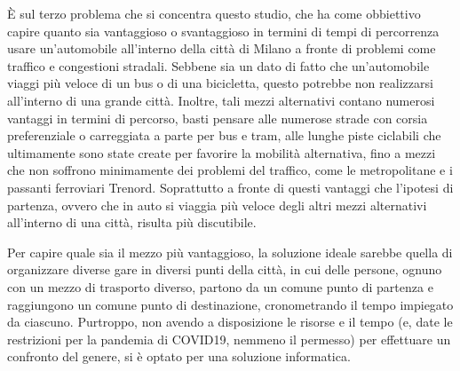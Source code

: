 È sul terzo problema che si concentra questo studio, che ha come obbiettivo capire quanto sia vantaggioso o svantaggioso in termini di tempi di percorrenza usare un'automobile all'interno della città di Milano a fronte di problemi come traffico e congestioni stradali.
Sebbene sia un dato di fatto che un'automobile viaggi più veloce di un bus o di una bicicletta, questo potrebbe non realizzarsi all'interno di una grande città. Inoltre, tali mezzi alternativi contano numerosi vantaggi in termini di percorso, basti pensare alle numerose strade con corsia preferenziale o carreggiata a parte per bus e tram, alle lunghe piste ciclabili che ultimamente sono state create per favorire la mobilità alternativa, fino a mezzi che non soffrono minimamente dei problemi del traffico, come le metropolitane e i passanti ferroviari Trenord. Soprattutto a fronte di questi vantaggi che l'ipotesi di partenza, ovvero che in auto si viaggia più veloce degli altri mezzi alternativi all'interno di una città, risulta più discutibile.

Per capire quale sia il mezzo più vantaggioso, la soluzione ideale sarebbe quella di organizzare diverse gare in diversi punti della città, in cui delle persone, ognuno con un mezzo di trasporto diverso, partono da un comune punto di partenza e raggiungono un comune punto di destinazione, cronometrando il tempo impiegato da ciascuno. Purtroppo, non avendo a disposizione le risorse e il tempo (e, date le restrizioni per la pandemia di COVID19, nemmeno il permesso) per effettuare un confronto del genere, si è optato per una soluzione informatica.

